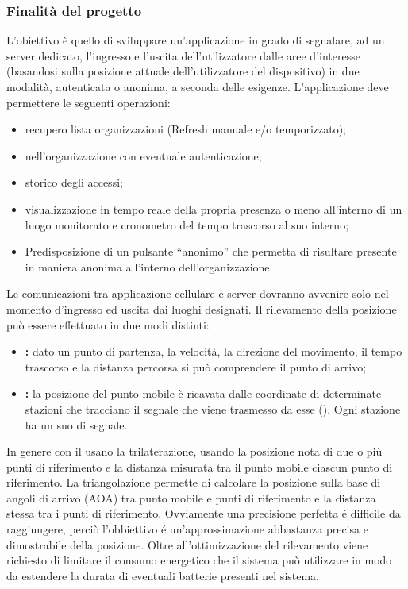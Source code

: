 	\subsubsection{Finalità del progetto}
		L’obiettivo è quello di sviluppare un’applicazione in grado di segnalare, ad un server dedicato, l’ingresso e l’uscita dell’utilizzatore dalle aree d’interesse (basandosi sulla posizione attuale dell'utilizzatore del dispositivo) in due modalità, autenticata o anonima, a seconda delle esigenze.
		L’applicazione deve permettere le seguenti operazioni:
		\begin{itemize}
			\item recupero lista organizzazioni (Refresh manuale e/o temporizzato);
			\item {} nell’organizzazione con eventuale autenticazione;
			\item storico degli accessi;
			\item visualizzazione in tempo reale della propria presenza o meno all’interno di un luogo monitorato e cronometro del tempo trascorso al suo interno;
			\item Predisposizione di un pulsante ``anonimo'' che permetta di risultare presente in maniera anonima all'interno dell'organizzazione.
		\end{itemize}
		Le comunicazioni tra applicazione cellulare e server dovranno avvenire solo nel momento d'ingresso ed uscita dai luoghi designati. Il rilevamento della posizione può essere effettuato in due modi distinti:
		\begin{itemize}
			\item \textbf{:} dato un punto di partenza, la velocità, la direzione del movimento, il tempo trascorso e la distanza percorsa si può comprendere il punto di arrivo;
			\item \textbf{:} la posizione del punto mobile è ricavata dalle coordinate di determinate stazioni che tracciano il segnale che viene trasmesso da esse (). Ogni stazione ha un suo  di segnale.
		\end{itemize}
		In genere con il  usano la trilaterazione, usando la posizione nota di due o più punti di riferimento e la distanza misurata tra il punto mobile ciascun punto di riferimento. La triangolazione permette di calcolare la posizione sulla base di angoli di arrivo (AOA) tra punto mobile e punti di riferimento e la distanza stessa tra i punti di riferimento. Ovviamente una precisione perfetta é difficile da raggiungere, perciò l'obbiettivo é un'approssimazione abbastanza precisa e dimostrabile della posizione. Oltre all'ottimizzazione del rilevamento viene richiesto di limitare il consumo energetico che il sistema può utilizzare in modo da estendere la durata di eventuali batterie presenti nel sistema.

